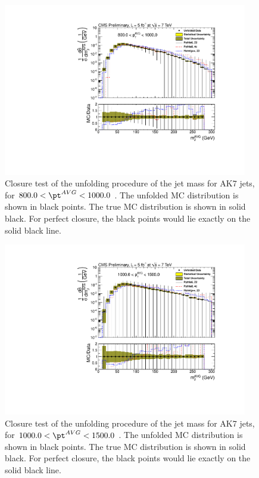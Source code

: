 \begin{figure}[htbp]
\centering
\includegraphics[width=0.95\textwidth]{figs/unfoldedMeasurementDijets_9_closuretest}
\caption{Closure test of the unfolding procedure of the jet mass for AK7 jets,
for $800.0 < \pt^{AVG} < 1000.0$ \GeVc. The unfolded MC distribution is shown in black points.
The true MC distribution is shown in solid black. For perfect closure, the black points would
lie exactly on the solid black line.  
\label{figs:unfoldedMeasurementDijets_9_closuretest}}
\end{figure}



\begin{figure}[htbp]
\centering
\includegraphics[width=0.95\textwidth]{figs/unfoldedMeasurementDijets_10_closuretest}
\caption{Closure test of the unfolding procedure of the jet mass for AK7 jets,
for $1000.0 < \pt^{AVG} < 1500.0$ \GeVc. The unfolded MC distribution is shown in black points.
The true MC distribution is shown in solid black. For perfect closure, the black points would
lie exactly on the solid black line.  
\label{figs:unfoldedMeasurementDijets_10_closuretest}}
\end{figure}

\clearpage
